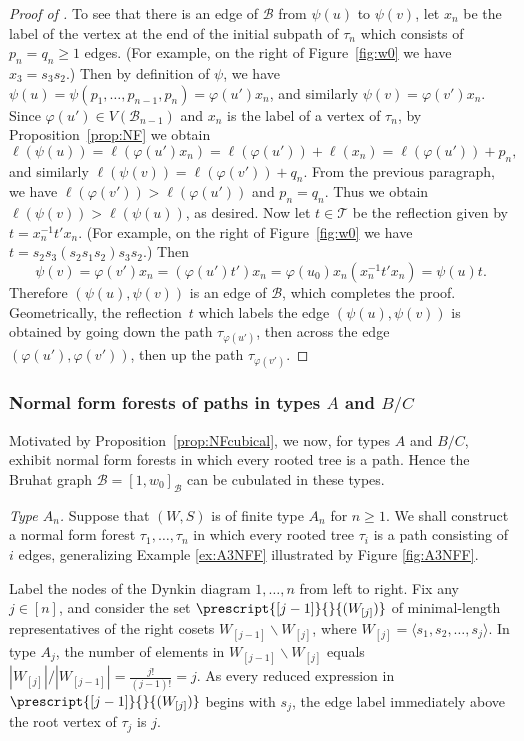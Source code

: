 \documentclass[11pt]{amsart}
\theoremstyle{plain}
\theoremstyle{definition}
\newcommand{\cB}{\mathcal B}
\newcommand{\cT}{\mathcal T}
\numberwithin{equation}{subsection}
\begin{document}
\begin{proof}[Proof of ]
To see that there is an edge of $\cB$ from $\psi(u)$ to $\psi(v)$, let $x_n$ be the label of the vertex at the end of the initial subpath of $\tau_n$ which consists of $p_n = q_n \geq 1$ edges. (For example, on the right of Figure~\ref{fig:w0} we have $x_3 = s_3 s_2$.) 
Then by definition of $\psi$, we have $\psi(u) = \psi(p_1, \dots, p_{n-1},p_n) = \varphi(u') x_n$, and similarly $\psi(v) = \varphi(v') x_n$. Since $\varphi(u') \in V(\cB_{n-1})$ and $x_n$ is the label of a vertex of $\tau_n$, by Proposition~\ref{prop:NF} we obtain \[ \ell(\psi(u)) = \ell(\varphi(u')x_n) = \ell(\varphi(u')) + \ell(x_n) = \ell(\varphi(u')) + p_n,\] and similarly $\ell(\psi(v)) = \ell(\varphi(v')) + q_n$. From the previous paragraph, we have $\ell(\varphi(v')) > \ell(\varphi(u'))$ and $p_n = q_n$. Thus we obtain  $\ell(\psi(v)) > \ell(\psi(u))$, as desired. 
Now let $t \in \cT$ be the reflection given by $t = x_n^{-1} t' x_n$. (For example, on the right of Figure~\ref{fig:w0} we have $t = s_2 s_3 (s_2 s_1 s_2) s_3 s_2$.) Then  \[ \psi(v) = \varphi(v') x_n = (\varphi(u') t') x_n = \varphi(u_0) x_n (x_n^{-1} t' x_n) = \psi(u)t.\]  
Therefore $(\psi(u),\psi(v))$ is an edge of $\cB$, which completes the proof. Geometrically, the reflection~$t$ which labels the edge $(\psi(u),\psi(v))$ is obtained by going down the path $\tau_{\varphi(u')}$, then across the edge $(\varphi(u'),\varphi(v'))$, then up the path $\tau_{\varphi(v')}$. \end{proof}





\subsubsection{Normal form forests of paths in types $A$ and $B/C$}\label{sec:classical}


Motivated by Proposition~\ref{prop:NFcubical}, we now, for types $A$ and $B/C$, exhibit normal form forests in which every rooted tree is a path. Hence the Bruhat graph $\cB = [1,w_0]_\cB$ can be cubulated in these types.

\emph{Type $A_n$.} Suppose that $(W,S)$ is of finite type $A_n$ for $n \geq 1$.  We shall construct a normal form forest $\tau_1, \dots, \tau_n$ in which every rooted tree $\tau_i$ is a path consisting of $i$ edges, generalizing Example \ref{ex:A3NFF} illustrated by Figure \ref{fig:A3NFF}.  

Label the nodes of the Dynkin diagram $1, \dots, n$ from left to right. Fix any $j \in [n]$, and consider the set $\prescript{[j-1]}{}{(W_{[j]})}$ of minimal-length representatives of the right cosets $W_{[j-1]} \backslash W_{[j]}$, where $W_{[j]} = \langle s_1, s_2, \dots, s_j \rangle$. In type $A_j$, the number of elements in $W_{[j-1]} \backslash W_{[j]}$ equals $|W_{[j]}| / |W_{[j-1]}| = \frac{j!}{(j-1)!} = j$. As every reduced expression in $\prescript{[j-1]}{}{(W_{[j]})}$ begins with $s_j$, the edge label immediately above the root vertex of $\tau_j$ is $j$. 
\end{document}
